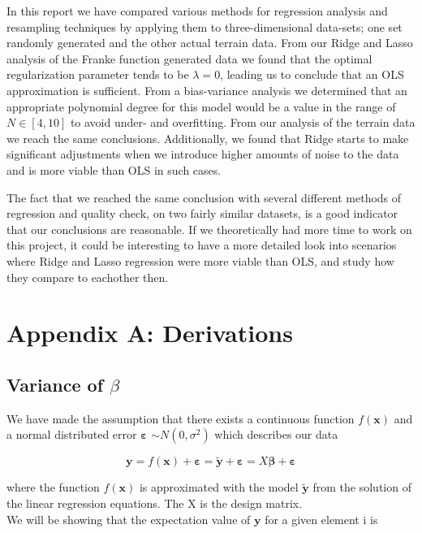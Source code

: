 \documentclass[reprint,english,notitlepage]{revtex4-1}  %
\begin{document}
In this report we have compared various methods for regression analysis and resampling techniques by applying them to three-dimensional data-sets; one set randomly generated and the other actual terrain data. From our Ridge and Lasso analysis of the Franke function generated data we found that the optimal regularization parameter tends to be $\lambda = 0$, leading us to conclude that an OLS approximation is sufficient. From a bias-variance analysis we determined that an appropriate polynomial degree for this model would be a value in the range of $N \in [4, 10]$ to avoid under- and overfitting. From our analysis of the terrain data we reach the same conclusions. Additionally, we found that Ridge starts to make significant adjustments when we introduce higher amounts of noise to the data and is more viable than OLS in such cases.

The fact that we reached the same conclusion with several different methods of regression and quality check, on two fairly similar datasets, is a good indicator that our conclusions are reasonable. If we theoretically had more time to work on this project, it could be interesting to have a more detailed look into scenarios where Ridge and Lasso regression were more viable than OLS, and study how they compare to eachother then.

\section{Appendix A: Derivations}


    \subsection{Variance of $\beta$}

    We have made the assumption that there exists a continuous function $f(\mathbf{x})$ and a normal distributed error $\boldsymbol{\varepsilon}$ $\sim N(0, \sigma^2)$ which describes our data

    $$\mathbf{y} = f(\mathbf{x}) + \boldsymbol{\varepsilon} = \mathbf{\tilde{y}} + \boldsymbol{\varepsilon}= X \mathbf{\beta} + \boldsymbol{\varepsilon}$$

    where the function $f(\mathbf{x})$ is approximated with the model $\mathbf{\tilde{y}}$ from the solution of the linear regression equations. The X is the design matrix. \\


    We will be showing that the expectation value of $\mathbf{y}$ for a given element i is 
\end{document}
